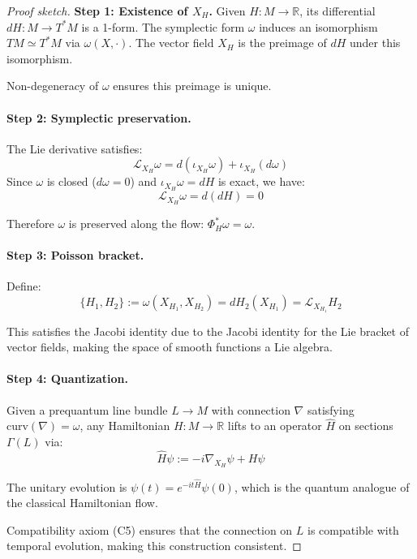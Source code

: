 \documentclass[11pt]{article}
\theoremstyle{definition}
\begin{document}
\begin{proof}[Proof sketch]
\textbf{Step 1: Existence of $X_H$.}
Given $H : M \to \mathbb{R}$, its differential $dH : M \to T^*M$ is a 1-form. The symplectic form $\omega$ induces an isomorphism $TM \simeq T^*M$ via $\omega(X, \cdot)$. The vector field $X_H$ is the preimage of $dH$ under this isomorphism.

Non-degeneracy of $\omega$ ensures this preimage is unique.

\paragraph{Step 2: Symplectic preservation.}
The Lie derivative satisfies:
\[
\mathcal{L}_{X_H} \omega = d(\iota_{X_H} \omega) + \iota_{X_H} (d\omega)
\]
Since $\omega$ is closed ($d\omega = 0$) and $\iota_{X_H} \omega = dH$ is exact, we have:
\[
\mathcal{L}_{X_H} \omega = d(dH) = 0
\]

Therefore $\omega$ is preserved along the flow: $\Phi_H^* \omega = \omega$.

\paragraph{Step 3: Poisson bracket.}
Define:
\[
\{H_1, H_2\} := \omega(X_{H_1}, X_{H_2}) = dH_2(X_{H_1}) = \mathcal{L}_{X_{H_1}} H_2
\]

This satisfies the Jacobi identity due to the Jacobi identity for the Lie bracket of vector fields, making the space of smooth functions a Lie algebra.

\paragraph{Step 4: Quantization.}
Given a prequantum line bundle $L \to M$ with connection $\nabla$ satisfying $\text{curv}(\nabla) = \omega$, any Hamiltonian $H : M \to \mathbb{R}$ lifts to an operator $\hat{H}$ on sections $\Gamma(L)$ via:
\[
\hat{H}\psi := -i\nabla_{X_H}\psi + H\psi
\]

The unitary evolution is $\psi(t) = e^{-it\hat{H}}\psi(0)$, which is the quantum analogue of the classical Hamiltonian flow.

Compatibility axiom (C5) ensures that the connection on $L$ is compatible with temporal evolution, making this construction consistent.
\end{proof}
\end{document}
